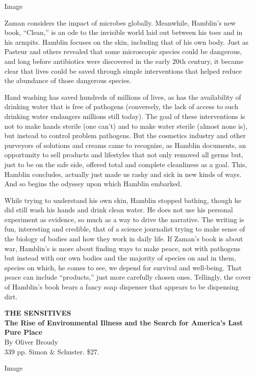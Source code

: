 Image

Zaman considers the impact of microbes globally. Meanwhile, Hamblin's
new book, ``Clean,'' is an ode to the invisible world laid out between
his toes and in his armpits. Hamblin focuses on the skin, including that
of his own body. Just as Pasteur and others revealed that some
microscopic species could be dangerous, and long before antibiotics were
discovered in the early 20th century, it became clear that lives could
be saved through simple interventions that helped reduce the abundance
of those dangerous species.

Hand washing has saved hundreds of millions of lives, as has the
availability of drinking water that is free of pathogens (conversely,
the lack of access to such drinking water endangers millions still
today). The goal of these interventions is not to make hands sterile
(one can't) and to make water sterile (almost none is), but instead to
control problem pathogens. But the cosmetics industry and other
purveyors of solutions and creams came to recognize, as Hamblin
documents, an opportunity to sell products and lifestyles that not only
removed all germs but, just to be on the safe side, offered total and
complete cleanliness as a goal. This, Hamblin concludes, actually just
made us rashy and sick in new kinds of ways. And so begins the odyssey
upon which Hamblin embarked.

While trying to understand his own skin, Hamblin stopped bathing, though
he did still wash his hands and drink clean water. He does not use his
personal experiment as evidence, so much as a way to drive the
narrative. The writing is fun, interesting and credible, that of a
science journalist trying to make sense of the biology of bodies and how
they work in daily life. If Zaman's book is about war, Hamblin's is more
about finding ways to make peace, not with pathogens but instead with
our own bodies and the majority of species on and in them, species on
which, he comes to see, we depend for survival and well-being. That
peace can include ``products,'' just more carefully chosen ones.
Tellingly, the cover of Hamblin's book bears a fancy soap dispenser that
appears to be dispensing dirt.

\textbf{THE SENSITIVES}\\
\textbf{The Rise of Environmental Illness and the Search for America's
Last Pure Place}\\
By Oliver Broudy\\
339 pp. Simon \& Schuster. \$27.

Image

